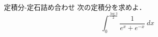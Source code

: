 \documentclass[a4paper,fleqn,dvipdfmx]{jsarticle}
\begin{document}
\newpage
\noindent
\begin{itembox}[l]{定積分-定石詰め合わせ}
次の定積分を求めよ．
    \[\displaystyle\int_{0}^{\frac{\log 3}{2}} \displaystyle\frac{1}{e^x+e^{-x}}\ dx\]
\end{itembox}
\end{document}
